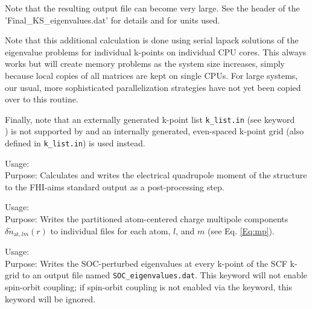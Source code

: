 Note that the resulting output file can become very large. See the header of the
'Final\_KS\_eigenvalues.dat' for details and for units used.

Note that this additional calculation is done using serial lapack solutions
of the eigenvalue problems for individual k-points on individual CPU cores.
This always works but will create memory problems as the system size increases,
simply because local copies of all matrices are kept on single CPUs. For large
systems, our usual, more sophisticated parallelization strategies have not yet
been copied over to this routine.

Finally, note that an externally generated k-point list
\texttt{k\_list.in} (see keyword \\ ) is not
supported by 
 and an internally generated,
even-spaced k-point grid (also defined in \texttt{k\_list.in}) is used instead.

{
  \noindent
  Usage:   \\[1.0ex]
  Purpose: Calculates and writes the electrical quadrupole moment of the
    structure to the FHI-aims standard output as a post-processing step. \\[1.0ex]
}

{
  \noindent
  Usage:   \\[1.0ex]
  Purpose: Writes the partitioned atom-centered charge multipole
    components $\delta\tilde{n}_{\text{at},lm}(r)$ to individual files
    for each atom, $l$, and $m$ (see Eq. \ref{Eq:mp}). \\[1.0ex]
}

{
  \noindent
  Usage:   \\[1.0ex]
  Purpose:  Writes the SOC-perturbed eigenvalues at every k-point of the SCF k-grid
    to an output file named \texttt{SOC\_eigenvalues.dat}.  This keyword will not enable
    spin-orbit coupling;  if spin-orbit coupling is not enabled via the
     keyword, this keyword will be ignored.  \\[1.0ex]
}

